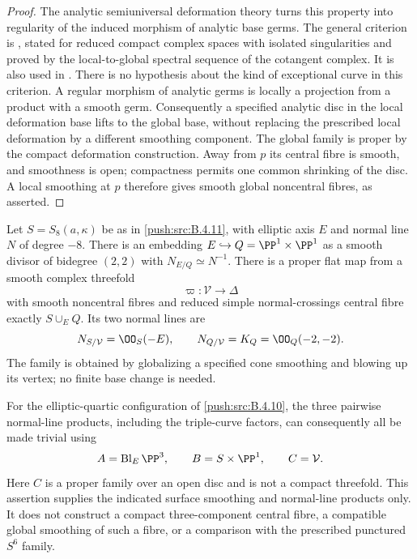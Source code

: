 \begin{proof}
The analytic semiuniversal deformation theory turns this
property into regularity of the induced morphism of analytic
base germs.  The general criterion is
\citet[Lemma~1, p.~93]{Manetti1991D}, stated for reduced compact
complex spaces with isolated singularities and proved by the
local-to-global spectral sequence of the cotangent complex.
It is also used in
\citet[Section~3.2, Proposition~3.3 and the discussion preceding
Proposition~3.4]{DlousskyTeleman2020D}.
There is no hypothesis about the kind of exceptional curve
in this criterion.  A regular morphism of analytic
germs is locally a projection from a product with a smooth
germ.  Consequently a specified analytic disc in the local
deformation base lifts to the global base, without replacing
the prescribed local deformation by a different smoothing
component.
The global family is proper by the compact deformation
construction.  Away from $p$ its central fibre is smooth,
and smoothness is open; compactness permits one common
shrinking of the disc.  A local smoothing at $p$ therefore
gives smooth global noncentral fibres, as asserted.
\end{proof}

\begin{proposition}\label{push:src:B.4.12}
Let $S=S_8(a,\kappa)$ be as in \ref{push:src:B.4.11}, with elliptic axis $E$
and normal line $N$ of degree $-8$.
There is an embedding $E\hookrightarrow Q=\PP^1\times\PP^1$
as a smooth divisor of bidegree $(2,2)$ with
$N_{E/Q}\simeq N^{-1}$.
There is a proper flat map from a smooth complex threefold
\[
 \varpi:\mathcal V\longrightarrow\Delta
\]
with smooth noncentral fibres and reduced simple normal-crossings
central fibre exactly $S\cup_E Q$.  Its two normal lines are
\[
 N_{S/\mathcal V}=\OO_S(-E),\qquad
 N_{Q/\mathcal V}=K_Q=\OO_Q(-2,-2).
\]
The family is obtained by globalizing a specified cone smoothing
and blowing up its vertex; no finite base change is needed.

For the elliptic-quartic configuration of \ref{push:src:B.4.10}, the three
pairwise normal-line products, including the triple-curve factors,
can consequently all be made trivial using
\[
 A=\operatorname{Bl}_E\PP^3,\qquad
 B=S\times\PP^1,\qquad C=\mathcal V.
\]
Here $C$ is a proper family over an open disc and is not a compact
threefold.  This assertion supplies the indicated surface smoothing
and normal-line products only.  It does not construct a compact
three-component central fibre, a compatible global smoothing of
such a fibre, or a comparison with the prescribed punctured
$S^6$ family.
\end{proposition}

